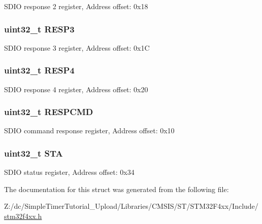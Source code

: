 S\-D\-I\-O response 2 register, Address offset\-: 0x18 \hypertarget{struct_s_d_i_o___type_def_a3da04fbdd44f48a1840e5e0a6295f3cf}{
\subsubsection[{R\-E\-S\-P3}]{ uint32\-\_\-t R\-E\-S\-P3}}\label{struct_s_d_i_o___type_def_a3da04fbdd44f48a1840e5e0a6295f3cf}
S\-D\-I\-O response 3 register, Address offset\-: 0x1\-C \hypertarget{struct_s_d_i_o___type_def_ac760383de212de696f504e744c6fca7e}{
\subsubsection[{R\-E\-S\-P4}]{ uint32\-\_\-t R\-E\-S\-P4}}\label{struct_s_d_i_o___type_def_ac760383de212de696f504e744c6fca7e}
S\-D\-I\-O response 4 register, Address offset\-: 0x20 \hypertarget{struct_s_d_i_o___type_def_aad371db807e2db4a2edf05b3f2f4b6cd}{
\subsubsection[{R\-E\-S\-P\-C\-M\-D}]{ uint32\-\_\-t R\-E\-S\-P\-C\-M\-D}}\label{struct_s_d_i_o___type_def_aad371db807e2db4a2edf05b3f2f4b6cd}
S\-D\-I\-O command response register, Address offset\-: 0x10 \hypertarget{struct_s_d_i_o___type_def_a7520cdf6f3df68c2f147bdd87fb8a96f}{
\subsubsection[{S\-T\-A}]{ uint32\-\_\-t S\-T\-A}}\label{struct_s_d_i_o___type_def_a7520cdf6f3df68c2f147bdd87fb8a96f}
S\-D\-I\-O status register, Address offset\-: 0x34 

The documentation for this struct was generated from the following file\-:\begin{DoxyCompactItemize}
\item 
Z\-:/dc/\-Simple\-Timer\-Tutorial\-\_\-\-Upload/\-Libraries/\-C\-M\-S\-I\-S/\-S\-T/\-S\-T\-M32\-F4xx/\-Include/\hyperlink{stm32f4xx_8h}{stm32f4xx.\-h}\end{DoxyCompactItemize}
